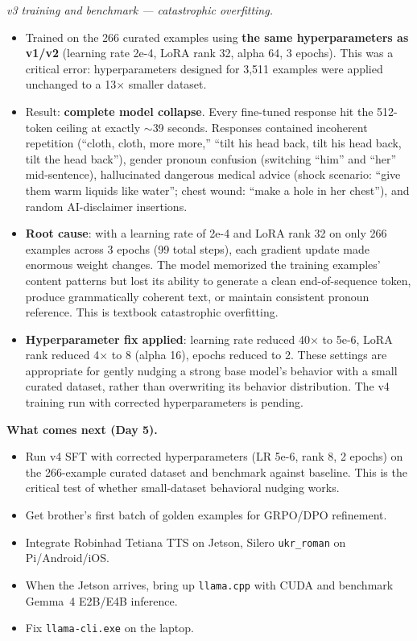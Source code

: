 \documentclass{article}
\theoremstyle{plain}
\theoremstyle{definition}
\theoremstyle{remark}
\begin{document}
\textit{v3 training and benchmark --- catastrophic overfitting.}
\begin{itemize}
\item Trained on the 266 curated examples using \textbf{the same hyperparameters as v1/v2} (learning rate 2e-4, LoRA rank 32, alpha 64, 3 epochs). This was a critical error: hyperparameters designed for 3{,}511 examples were applied unchanged to a 13$\times$ smaller dataset.
\item Result: \textbf{complete model collapse}. Every fine-tuned response hit the 512-token ceiling at exactly $\sim$39 seconds. Responses contained incoherent repetition (``cloth, cloth, more more,'' ``tilt his head back, tilt his head back, tilt the head back''), gender pronoun confusion (switching ``him'' and ``her'' mid-sentence), hallucinated dangerous medical advice (shock scenario: ``give them warm liquids like water''; chest wound: ``make a hole in her chest''), and random AI-disclaimer insertions.
\item \textbf{Root cause}: with a learning rate of 2e-4 and LoRA rank 32 on only 266 examples across 3 epochs (99 total steps), each gradient update made enormous weight changes. The model memorized the training examples' content patterns but lost its ability to generate a clean end-of-sequence token, produce grammatically coherent text, or maintain consistent pronoun reference. This is textbook catastrophic overfitting.
\item \textbf{Hyperparameter fix applied}: learning rate reduced 40$\times$ to 5e-6, LoRA rank reduced 4$\times$ to 8 (alpha 16), epochs reduced to 2. These settings are appropriate for gently nudging a strong base model's behavior with a small curated dataset, rather than overwriting its behavior distribution. The v4 training run with corrected hyperparameters is pending.
\end{itemize}

\textbf{What comes next (Day 5).}
\begin{itemize}
\item Run v4 SFT with corrected hyperparameters (LR 5e-6, rank 8, 2 epochs) on the 266-example curated dataset and benchmark against baseline. This is the critical test of whether small-dataset behavioral nudging works.
\item Get brother's first batch of golden examples for GRPO/DPO refinement.
\item Integrate Robinhad Tetiana TTS on Jetson, Silero \texttt{ukr\_roman} on Pi/Android/iOS.
\item When the Jetson arrives, bring up \texttt{llama.cpp} with CUDA and benchmark Gemma~4 E2B/E4B inference.
\item Fix \texttt{llama-cli.exe} on the laptop.
\end{itemize}
\end{document}
